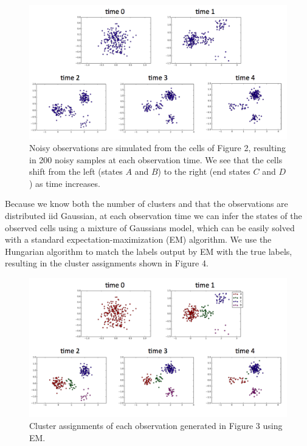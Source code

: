 \documentclass[11pt,onecolumn]{article}
\begin{document}
\begin{figure}[!htb]
		\captionsetup{width=.8\linewidth}
		\caption{Noisy observations are simulated from the cells of Figure 2, resulting in 200 noisy samples at each observation time. We see that the cells shift from the left (states $A$ and $B$) to the right (end states $C$ and $D$) as time increases.}
		\centering
		\includegraphics[scale=0.35]{Fig3.png}
\end{figure}

Because we know both the number of clusters and that the observations are distributed iid Gaussian, at each observation time we can infer the states of the observed cells using a mixture of Gaussians model, which can be easily solved with a standard expectation-maximization (EM) algorithm. We use the Hungarian algorithm to match the labels output by EM with the true labels, resulting in the cluster assignments shown in Figure 4. \\

\begin{figure}[!htb]
		\captionsetup{width=.8\linewidth}
		\caption{Cluster assignments of each observation generated in Figure 3 using EM.}
		\centering
		\includegraphics[scale=0.35]{Fig4.png}
\end{figure}
\end{document}
